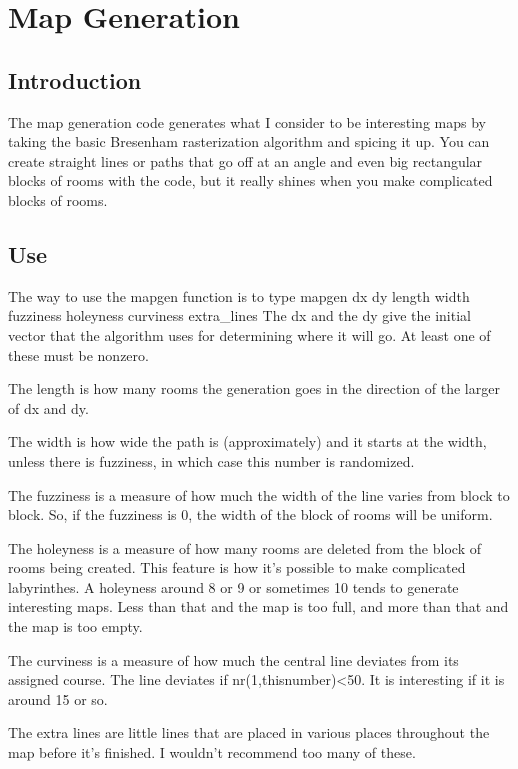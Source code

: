 \chapter{Map Generation}

\section{Introduction}

The map generation code generates what I consider to be interesting
maps by taking the basic Bresenham rasterization algorithm and spicing
it up. You can create straight lines or paths that go off at an angle
and even big rectangular blocks of rooms with the code, but it really
shines when you make complicated blocks of rooms.

\section{Use}

The way to use the mapgen function is to type
\vv
mapgen dx dy length width fuzziness holeyness curviness extra\_lines
\vv
The dx and the dy give the initial vector that the algorithm uses
for determining where it will go. At least one of these must be
nonzero. 

The length is how many rooms the generation goes in the direction of the
larger of dx and dy.

The width is how wide the path is (approximately) and it starts at the width,
unless there is fuzziness, in which case this number is randomized.

The fuzziness is a measure of how much the width of the line varies from block
to block. So, if the fuzziness is 0, the width of the block of rooms will be
uniform.

The holeyness is a measure of how many rooms are deleted from the block of
rooms being created. This feature is how it's possible to make complicated 
labyrinthes. A holeyness around 8 or 9 or sometimes 10 tends to generate
interesting maps. Less than that and the map is too full, and more
than that and the map is too empty.

The curviness is a measure of how much the central line deviates from its
assigned course. The line deviates if nr(1,thisnumber)<50. It is interesting
if it is around 15 or so.

The extra lines are little lines that are placed in various places
throughout the map before it's finished. I wouldn't recommend too many
of these.


